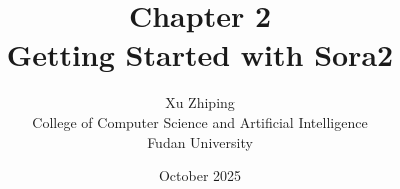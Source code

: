 \documentclass[11pt,letterpaper]{book}
\begin{document}
\title{Chapter 2\\
\large Getting Started with Sora2}
\author{Xu Zhiping\\
\small College of Computer Science and Artificial Intelligence\\
\small Fudan University}
\date{October 2025}
\maketitle

\tableofcontents

\setcounter{chapter}{1}




\printindex
\end{document}
